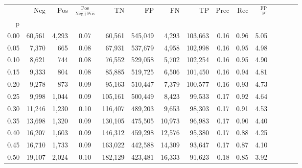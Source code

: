 \begin{tabular}{rrrcrrrrrrrrrrr}
\toprule
{} &     Neg &     Pos & $\frac{\text{Pos}}{\text{Neg}+\text{Pos}}$ &       TN &       FP &       FN &       TP &  Prec &   Rec & $\frac{\text{FP}}{\text{P}}$ \\
p    &         &         &                                            &          &          &          &          &       &       &                              \\
\midrule
0.00 &  60,561 &   4,293 &                                       0.07 &   60,561 &  545,049 &    4,293 &  103,663 &  0.16 &  0.96 &                         5.05 \\
0.05 &   7,370 &     665 &                                       0.08 &   67,931 &  537,679 &    4,958 &  102,998 &  0.16 &  0.95 &                         4.98 \\
0.10 &   8,621 &     744 &                                       0.08 &   76,552 &  529,058 &    5,702 &  102,254 &  0.16 &  0.95 &                         4.90 \\
0.15 &   9,333 &     804 &                                       0.08 &   85,885 &  519,725 &    6,506 &  101,450 &  0.16 &  0.94 &                         4.81 \\
0.20 &   9,278 &     873 &                                       0.09 &   95,163 &  510,447 &    7,379 &  100,577 &  0.16 &  0.93 &                         4.73 \\
0.25 &   9,998 &   1,044 &                                       0.09 &  105,161 &  500,449 &    8,423 &   99,533 &  0.17 &  0.92 &                         4.64 \\
0.30 &  11,246 &   1,230 &                                       0.10 &  116,407 &  489,203 &    9,653 &   98,303 &  0.17 &  0.91 &                         4.53 \\
0.35 &  13,698 &   1,320 &                                       0.09 &  130,105 &  475,505 &   10,973 &   96,983 &  0.17 &  0.90 &                         4.40 \\
0.40 &  16,207 &   1,603 &                                       0.09 &  146,312 &  459,298 &   12,576 &   95,380 &  0.17 &  0.88 &                         4.25 \\
0.45 &  16,710 &   1,733 &                                       0.09 &  163,022 &  442,588 &   14,309 &   93,647 &  0.17 &  0.87 &                         4.10 \\
0.50 &  19,107 &   2,024 &                                       0.10 &  182,129 &  423,481 &   16,333 &   91,623 &  0.18 &  0.85 &                         3.92 \\

\end{tabular}
